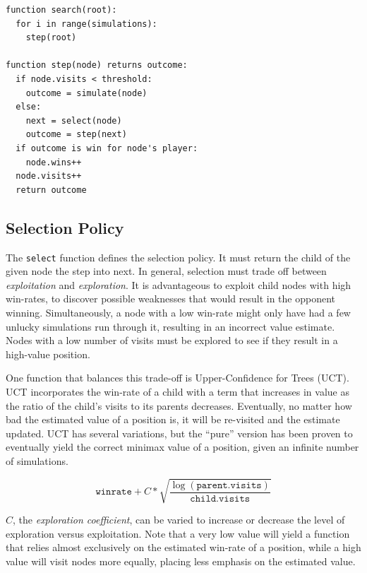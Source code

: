 \documentclass[10pt,a4paper]{report}
\begin{document}
\begin{verbatim}
function search(root):
  for i in range(simulations):
    step(root)
		
function step(node) returns outcome:
  if node.visits < threshold:
    outcome = simulate(node)
  else:
    next = select(node)
    outcome = step(next)
  if outcome is win for node's player:
    node.wins++
  node.visits++
  return outcome
\end{verbatim}

\subsection{Selection Policy}
The \texttt{select} function defines the selection policy. It must return the child of the given node the step into next. In general, selection must trade off between \emph{exploitation} and \emph{exploration}. It is advantageous to exploit child nodes with high win-rates, to discover possible weaknesses that would result in the opponent winning. Simultaneously, a node with a low win-rate might only have had a few unlucky simulations run through it, resulting in an incorrect value estimate. Nodes with a low number of visits must be explored to see if they result in a high-value position.

One function that balances this trade-off is Upper-Confidence for Trees (UCT). UCT incorporates the win-rate of a child with a term that increases in value as the ratio of the child's visits to its parents decreases. Eventually, no matter how bad the estimated value of a position is, it will be re-visited and the estimate updated. UCT has several variations, but the ``pure'' version has been proven to eventually yield the correct minimax value of a position, given an infinite number of simulations\cite{gelly2006exploration}.

\[
	\texttt{winrate} + C*\sqrt{\frac{\log{(\texttt{parent.visits})}}{\texttt{child.visits}}}
\]

$C$, the \emph{exploration coefficient}, can be varied to increase or decrease the level of exploration versus exploitation. Note that a very low value will yield a function that relies almost exclusively on the estimated win-rate of a position, while a high value will visit nodes more equally, placing less emphasis on the estimated value.
\end{document}
